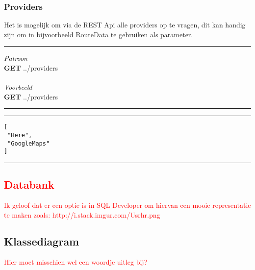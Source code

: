 \documentclass[ps,a4paper,oneside]{report}
\begin{document}
\subsubsection{Providers}
Het is mogelijk om via de REST Api alle providers op te vragen, dit kan handig zijn om in bijvoorbeeld RouteData te gebruiken als parameter.\\
\noindent\rule[0.5ex]{\linewidth}{1pt}
\textit{Patroon}\\
\textbf{GET} ../providers\\\\
\textit{Voorbeeld}\\
\textbf{GET} ../providers\\
\noindent\rule[0.5ex]{\linewidth}{1pt}
\noindent\rule[0.5ex]{\linewidth}{1pt}
\begin{verbatim}
[
 "Here",
 "GoogleMaps"
]
\end{verbatim}
\noindent\rule[0.5ex]{\linewidth}{1pt}
\textcolor{red}{\subsection{Databank}
Ik geloof dat er een optie is in SQL Developer om hiervan een mooie representatie te maken zoals: http://i.stack.imgur.com/Usrhr.png }
\subsection{Klassediagram}
\textcolor{red}{Hier moet misschien wel een woordje uitleg bij?}
\end{document}
